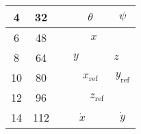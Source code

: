 \begin{table}[H]
\begin{tabular}{llclllllllllllllll}
		\multicolumn{1}{|c|}{4}    & \multicolumn{1}{c|}{32}  & \multicolumn{1}{c|}{}  & \multicolumn{9}{c|}{$\theta$}                                                                                                                                                                                                  & \multicolumn{6}{c|}{$\psi$}                                                                                                                               \\ \hline
		\multicolumn{1}{|c|}{6}    & \multicolumn{1}{c|}{48}  & \multicolumn{3}{c|}{}                                                    & \multicolumn{10}{c|}{$x$}                                                                                                                                                                                                                                  & \multicolumn{3}{c|}{}                                                       \\ \hline
		\multicolumn{1}{|c|}{8}    & \multicolumn{1}{c|}{64}  & \multicolumn{7}{c|}{$y$}                                                                                                                                                     & \multicolumn{9}{c|}{$z$}                                                                                                                                                                                                             \\ \hline
		\multicolumn{1}{|c|}{10}   & \multicolumn{1}{c|}{80}  & \multicolumn{1}{c|}{}  & \multicolumn{10}{c|}{$x_{\mathrm{ref}}$}                                                                                                                                                                                                                          & \multicolumn{5}{c|}{$y_{\mathrm{ref}}$}                                                                                                  \\ \hline
		\multicolumn{1}{|c|}{12}   & \multicolumn{1}{c|}{96}  & \multicolumn{5}{c|}{}                                                                                                      & \multicolumn{10}{c|}{$z_{\mathrm{ref}}$}                                                                                                                                                                                                                              & \multicolumn{1}{c|}{}   \\ \hline
		\multicolumn{1}{|c|}{14}   & \multicolumn{1}{c|}{112} & \multicolumn{10}{c|}{$\dot{x}$}& \multicolumn{6}{c|}{$\dot{y}$}                                                       \\ \hline

\end{tabular}
\end{table}
